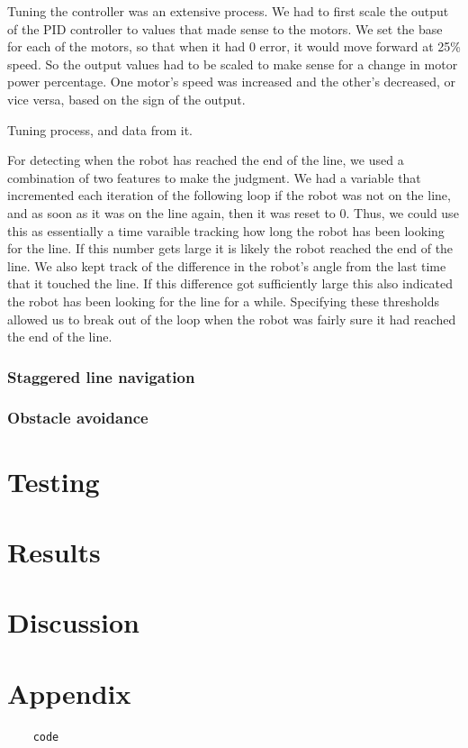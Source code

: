 \documentclass[12pt]{article}
\begin{document}
Tuning the controller was an extensive process. We had to first scale the output of the PID controller to values that made sense to the motors. We set the base  for each of the motors, so that when it had 0 error, it would move forward at 25\% speed.  So the output values had to be scaled to make sense for a change in motor power percentage. One motor's speed was increased and the other's decreased, or vice versa, based on the sign of the output.

Tuning process, and data from it.

For detecting when the robot has reached the end of the line, we used a combination of two features to make the judgment. We had a variable that incremented each iteration of the following loop if the robot was not on the line, and as soon as it was on the line again, then it was reset to 0. Thus, we could use this as essentially a time varaible tracking how long the robot has been looking for the line. If this number gets large it is likely the robot reached the end of the line. We also kept track of the difference in the robot's angle from the last time that it touched the line. If this difference got sufficiently large this also indicated the robot has been looking for the line for a while. Specifying these thresholds allowed us to break out of the loop when the robot was fairly sure it had reached the end of the line.

\subsubsection{Staggered line navigation}

\subsubsection{Obstacle avoidance}
\section{Testing}

\section{Results}

\section{Discussion}


\section*{Appendix}

\begin{verbatim}
	code
\end{verbatim}
\end{document}
